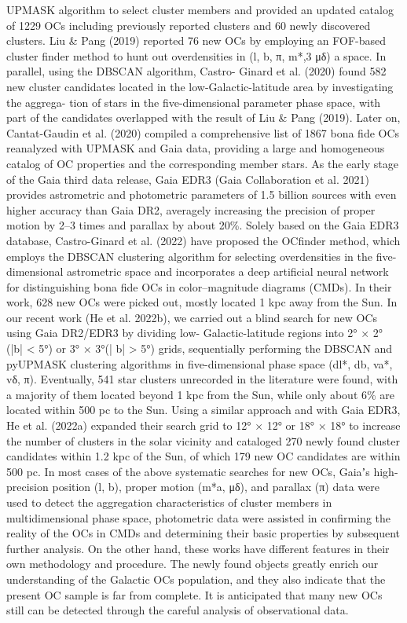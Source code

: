 \documentclass[../main.tex]{subfiles}
\begin{document}
UPMASK algorithm to select cluster members and provided an
updated catalog of 1229 OCs including previously reported
clusters and 60 newly discovered clusters. Liu & Pang (2019)
reported 76 new OCs by employing an FOF-based cluster
finder method to hunt out overdensities in (l, b, π, m*,3 μδ) a
space. In parallel, using the DBSCAN algorithm, Castro- Ginard et al. (2020) found 582 new cluster candidates located in the low-Galactic-latitude area by investigating the aggrega- tion of stars in the five-dimensional parameter phase space, with part of the candidates overlapped with the result of Liu & Pang (2019). Later on, Cantat-Gaudin et al. (2020) compiled a comprehensive list of 1867 bona fide OCs reanalyzed with UPMASK and Gaia data, providing a large and homogeneous catalog of OC properties and the corresponding member stars. As the early stage of the Gaia third data release, Gaia EDR3 (Gaia Collaboration et al. 2021) provides astrometric and photometric parameters of 1.5 billion sources with even higher accuracy than Gaia DR2, averagely increasing the precision of proper motion by 2–3 times and parallax by about 20\%. Solely based on the Gaia EDR3 database, Castro-Ginard et al. (2022) have proposed the OCfinder method, which employs the DBSCAN clustering algorithm for selecting overdensities in the five-dimensional astrometric space and incorporates a deep artificial neural network for distinguishing bona fide OCs in color–magnitude diagrams (CMDs). In their work, 628 new OCs were picked out, mostly located 1 kpc away from the Sun. In our recent work (He et al. 2022b), we carried out a blind search for new OCs using Gaia DR2/EDR3 by dividing low- Galactic-latitude regions into 2° × 2° (|b| < 5°) or 3° × 3°(| b| > 5°) grids, sequentially performing the DBSCAN and pyUPMASK clustering algorithms in five-dimensional phase space (dl*, db, va*, vδ, π). Eventually, 541 star clusters unrecorded in the literature were found, with a majority of them located beyond 1 kpc from the Sun, while only about 6\% are located within 500 pc to the Sun. Using a similar approach and with Gaia EDR3, He et al. (2022a) expanded their search grid to 12° × 12° or 18° × 18° to increase the number of clusters in the solar vicinity and cataloged 270 newly found cluster candidates within 1.2 kpc of the Sun, of which 179 new OC candidates are within 500 pc.
In most cases of the above systematic searches for new OCs, Gaiaʼs high-precision position (l, b), proper motion (m*a, μδ), and parallax (π) data were used to detect the aggregation characteristics of cluster members in multidimensional phase space, photometric data were assisted in confirming the reality of the OCs in CMDs and determining their basic properties by subsequent further analysis. On the other hand, these works have different features in their own methodology and procedure. The newly found objects greatly enrich our understanding of the Galactic OCs population, and they also indicate that the present OC sample is far from complete. It is anticipated that many new OCs still can be detected through the careful analysis of observational data.
\end{document}
